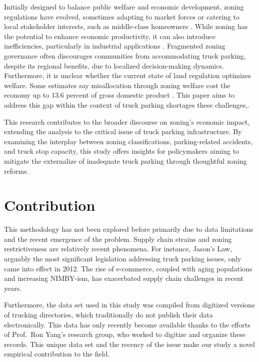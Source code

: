 \documentclass[
  12pt]{article}
\begin{document}
Initially designed to balance public welfare and economic development,
zoning regulations have evolved, sometimes adapting to market forces or
catering to local stakeholder interests, such as middle-class homeowners
\citep{fischelEconomicHistoryZoning2024}. While zoning has the potential
to enhance economic productivity, it can also introduce inefficiencies,
particularly in industrial applications
\citep{mcdonaldPDFEconomicsZoning2012}. Fragmented zoning governance
often discourages communities from accommodating truck parking, despite
its regional benefits, due to localized decision-making dynamics.
Furthermore, it is unclear whether the current state of land regulation
optimizes welfare. Some estimates say misallocation through zoning
welfare cost the economy up to 13.6 percent of gross domestic product
\citep{osmanRestrictiveLandUse2020}. This paper aims to address this gap
within the context of truck parking shortages these challenges,.

This research contributes to the broader discourse on zoning's economic
impact, extending the analysis to the critical issue of truck parking
infrastructure. By examining the interplay between zoning
classifications, parking-related accidents, and truck stop capacity,
this study offers insights for policymakers aiming to mitigate the
externalize of inadequate truck parking through thoughtful zoning
reforms.

\section{Contribution}\label{contribution}

This methodology has not been explored before primarily due to data
limitations and the recent emergence of the problem. Supply chain
strains and zoning restrictiveness are relatively recent phenomena. For
instance, Jason's Law, arguably the most significant legislation
addressing truck parking issues, only came into effect in 2012. The rise
of e-commerce, coupled with aging populations and increasing NIMBY-ism,
has exacerbated supply chain challenges in recent years.

Furthermore, the data set used in this study was compiled from digitized
versions of trucking directories, which traditionally do not publish
their data electronically. This data has only recently become available
thanks to the efforts of Prof.~Ron Yang's research group, who worked to
digitize and organize these records. This unique data set and the
recency of the issue make our study a novel empirical contribution to
the field.
\end{document}
